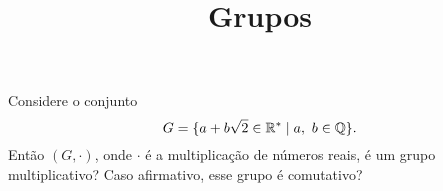 \documentclass{beamer}
\title{Grupos}
\author[\autor]{\autor}
\institute[\instituto]{\instituto}
\date{}
\begin{document}
    \begin{frame}
        \maketitle
    \end{frame}


    \begin{frame}
        \begin{exercicio}
            Considere o conjunto
            \[
                G = \{a + b\sqrt{2} \in \mathbb{R}^* \mid a,\ b \in \mathbb{Q}\}.
            \]
            Então $(G, \cdot)$, onde $\cdot$ é a multiplicação de números reais, é um grupo multiplicativo? Caso afirmativo, esse grupo é comutativo?
        \end{exercicio}
    \end{frame}
\end{document}
